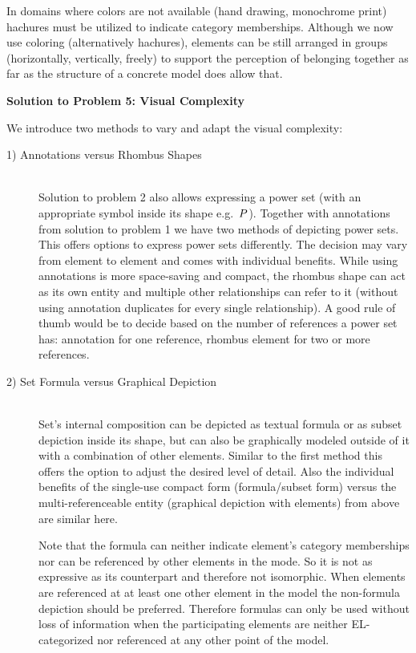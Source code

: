 \documentclass[twoside, openright, 12pt]{book}
\begin{document}
In domains where colors are not available (hand drawing, monochrome print) hachures must be utilized to indicate category memberships.
Although we now use coloring (alternatively hachures), elements can be still arranged in groups (horizontally, vertically, freely) to support the perception of belonging together as far as the structure of a concrete model does allow that.



\vspace{4mm}
\noindent
\textbf{Solution to Problem 5: Visual Complexity}
\vspace{1mm}

\noindent
We introduce two methods to vary and adapt the visual complexity:

\begin{description}
\item[1) Annotations versus Rhombus Shapes]\hfill \\
Solution to problem 2 also allows expressing a power set (with an appropriate symbol inside its shape e.g.\ $\euscr{P}$).
Together with annotations from solution to problem 1 we have two methods of depicting power sets.
This offers options to express power sets differently.
The decision may vary from element to element and comes with individual benefits.
While using annotations is more space-saving and compact, the rhombus shape can act as its own entity and multiple other relationships can refer to it (without using annotation duplicates for every single relationship).
A good rule of thumb would be to decide based on the number of references a power set has: annotation for one reference, rhombus element for two or more references.

\item[2) Set Formula versus Graphical Depiction]\hfill \\
Set's internal composition can be depicted as textual formula or as subset depiction inside its shape, but can also be graphically modeled outside of it with a combination of other elements.
Similar to the first method this offers the option to adjust the desired level of detail.
Also the individual benefits of the single-use compact form (formula/subset form) versus the multi-referenceable entity (graphical depiction with elements) from above are similar here.

Note that the formula can neither indicate element's category memberships nor can be referenced by other elements in the mode.
So it is not as expressive as its counterpart and therefore not isomorphic.
When elements are referenced at at least one other element in the model the non-formula depiction should be preferred.
Therefore formulas can only be used without loss of information when the participating elements are neither EL-categorized nor referenced at any other point of the model.
\end{description}
\end{document}
